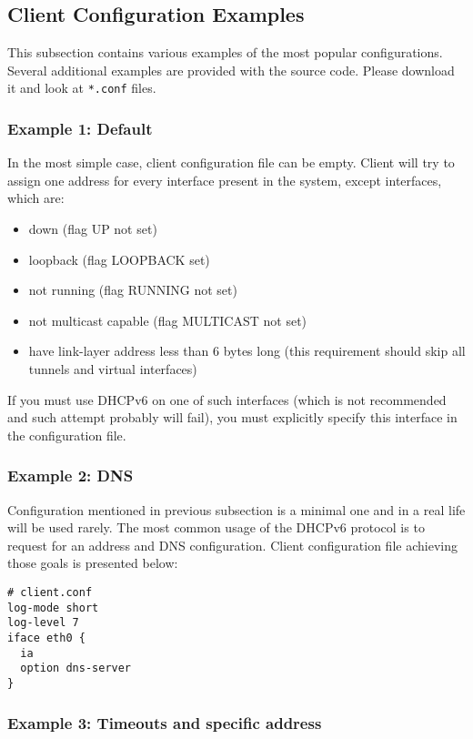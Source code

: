 \subsection{Client Configuration Examples}
This subsection contains various examples of the most popular
configurations. Several additional examples are provided with the source
code. Please download it and look at \verb+*.conf+ files.

\subsubsection{Example 1: Default}
In the most simple case, client configuration file can be empty. Client will try to
assign one address for every interface present in the system, except
interfaces, which are:
\begin{itemize}
\item down (flag UP not set)
\item loopback (flag LOOPBACK set)
\item not running (flag RUNNING not set)
\item not multicast capable (flag MULTICAST not set)
\item have link-layer address less than 6 bytes long (this requirement
      should skip all tunnels and virtual interfaces)
\end{itemize}

If you must use DHCPv6 on one of such interfaces (which is not
recommended and such attempt probably will fail), you must explicitly
specify this interface in the configuration file.

\subsubsection{Example 2: DNS}
Configuration mentioned in previous subsection is a minimal one and in a
real life will be used rarely. The most common usage of the DHCPv6
protocol is to request for an address and DNS configuration. Client
configuration file achieving those goals is presented below:
\begin{lstlisting}
# client.conf
log-mode short
log-level 7
iface eth0 {
  ia
  option dns-server
}
\end{lstlisting}

\subsubsection{Example 3: Timeouts and specific address}

